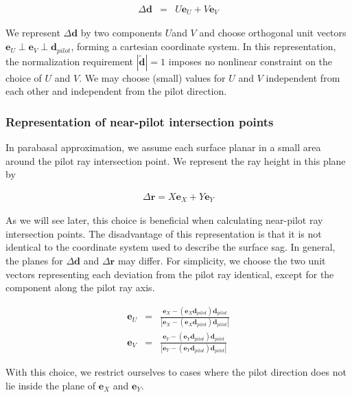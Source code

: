 \documentclass[12pt,a4paper,twoside,openright,BCOR10mm,headsepline,titlepage,abstracton,chapterprefix,final]{scrreprt}
\newcommand\Vector[1]{{\mathbf{#1}}}
\begin{document}
\begin{eqnarray}
 \Delta\Vector{d} &=& U \Vector{e}_{U} + V \Vector{e}_{V}
\end{eqnarray}

We represent $\Delta\Vector{d}$ by two components $U$and $V$ and choose orthogonal unit vectors $\Vector{e}_{U} \perp \Vector{e}_{V} \perp \Vector{d}_{pilot}$,
forming a cartesian coordinate system.
In this representation, the normalization requirement $|\tilde{\Vector{d}}| = 1$ imposes no nonlinear constraint on the choice of $U$ and $V$.
We may choose (small) values for $U$ and $V$ independent from each other and independent from the pilot direction. 

\subsubsection{Representation of near-pilot intersection points}

In parabasal approximation, we assume each surface planar in a small area around the pilot ray intersection point. 
We represent the ray height in this plane by

\begin{eqnarray}
 \Delta\Vector{r} = X \Vector{e}_{X} + Y \Vector{e}_{Y}
\end{eqnarray}

As we will see later, this choice is beneficial when calculating near-pilot ray intersection points.
The disadvantage of this representation is that it is not identical to the coordinate system used to describe the surface sag.
In general, the planes for $\Delta\Vector{d}$ and $\Delta\Vector{r}$ may differ.
For simplicity, we choose the two unit vectors representing each deviation from the pilot ray identical,
except for the component along the pilot ray axis.

\begin{eqnarray}
 \Vector{e}_{U} &=& \frac{\Vector{e}_{X} - (\Vector{e}_{X}\Vector{d}_{pilot})\Vector{d}_{pilot}}{|\Vector{e}_{X} - (\Vector{e}_{X}\Vector{d}_{pilot})\Vector{d}_{pilot}|}
 \\[2ex]
 \Vector{e}_{V} &=& \frac{\Vector{e}_{Y} - (\Vector{e}_{Y}\Vector{d}_{pilot})\Vector{d}_{pilot}}{|\Vector{e}_{Y} - (\Vector{e}_{Y}\Vector{d}_{pilot})\Vector{d}_{pilot}|}
\end{eqnarray}

With this choice, we restrict ourselves to cases where the pilot direction does not lie inside the plane of $\Vector{e}_{X}$ and $\Vector{e}_{Y}$.
\end{document}
